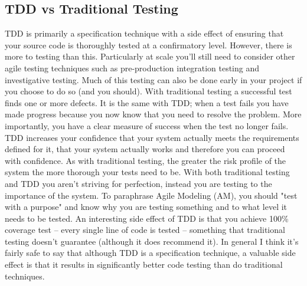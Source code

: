 \subsection{TDD vs Traditional Testing}
TDD is primarily a specification technique with a side effect of ensuring that your source code is thoroughly tested at a confirmatory level.  However, there is more to testing than this.  Particularly at scale you'll still need to consider other agile testing techniques such as pre-production integration testing and investigative testing. Much of this testing can also be done early in your project if you choose to do so (and you should). 
With traditional testing a successful test finds one or more defects. It is the same with TDD; when a test fails you have made progress because you now know that you need to resolve the problem. More importantly, you have a clear measure of success when the test no longer fails. TDD increases your confidence that your system actually meets the requirements defined for it, that your system actually works and therefore you can proceed with confidence. 
As with traditional testing, the greater the risk profile of the system the more thorough your tests need to be. With both traditional testing and TDD you aren't striving for perfection, instead you are testing to the importance of the system. To paraphrase Agile Modeling (AM), you should "test with a purpose" and know why you are testing something and to what level it needs to be tested.  An interesting side effect of TDD is that you achieve 100\% coverage test – every single line of code is tested – something that traditional testing doesn’t guarantee (although it does recommend it).  In general I think it’s fairly safe to say that although TDD is a specification technique, a valuable side effect is that it results in significantly better code testing than do traditional techniques.   
